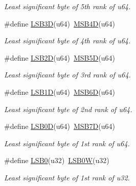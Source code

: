 \begin{DoxyCompactItemize}
\begin{DoxyCompactList}\small\item\em Least significant byte of 5th rank of {\itshape u64}. \end{DoxyCompactList}\item 
\#define \mbox{\hyperlink{group__group__sam0__utils_ga99213c01b979c347950eba4277f0499a}{L\+S\+B3D}}(u64)~\mbox{\hyperlink{group__group__sam0__utils_ga1c891624c33b13808633af8dbcaafa5f}{M\+S\+B4D}}(u64)
\begin{DoxyCompactList}\small\item\em Least significant byte of 4th rank of {\itshape u64}. \end{DoxyCompactList}\item 
\#define \mbox{\hyperlink{group__group__sam0__utils_gaba3bea07dcc4a37039b7effd4da03b9e}{L\+S\+B2D}}(u64)~\mbox{\hyperlink{group__group__sam0__utils_ga5e61db58aaf5cbb3051240cdcb1b5147}{M\+S\+B5D}}(u64)
\begin{DoxyCompactList}\small\item\em Least significant byte of 3rd rank of {\itshape u64}. \end{DoxyCompactList}\item 
\#define \mbox{\hyperlink{group__group__sam0__utils_ga42179f159b798116eb615102a549aa85}{L\+S\+B1D}}(u64)~\mbox{\hyperlink{group__group__sam0__utils_gacb8062d046ca06f5c28c9a015997494b}{M\+S\+B6D}}(u64)
\begin{DoxyCompactList}\small\item\em Least significant byte of 2nd rank of {\itshape u64}. \end{DoxyCompactList}\item 
\#define \mbox{\hyperlink{group__group__sam0__utils_ga2e20f5ef87ccf0ad44c1d49d6ffd80a3}{L\+S\+B0D}}(u64)~\mbox{\hyperlink{group__group__sam0__utils_ga0cbce69964fa2dd7bf05911d0b99b014}{M\+S\+B7D}}(u64)
\begin{DoxyCompactList}\small\item\em Least significant byte of 1st rank of {\itshape u64}. \end{DoxyCompactList}\item 
\#define \mbox{\hyperlink{group__group__sam0__utils_ga844ec34df36feb927dc92007af14674a}{L\+S\+B0}}(u32)~\mbox{\hyperlink{group__group__sam0__utils_ga2ca8582260a8ada6cdd457cf37ba37a7}{L\+S\+B0W}}(u32)
\begin{DoxyCompactList}\small\item\em Least significant byte of 1st rank of {\itshape u32}. \end{DoxyCompactList}\item 

\end{DoxyCompactItemize}
